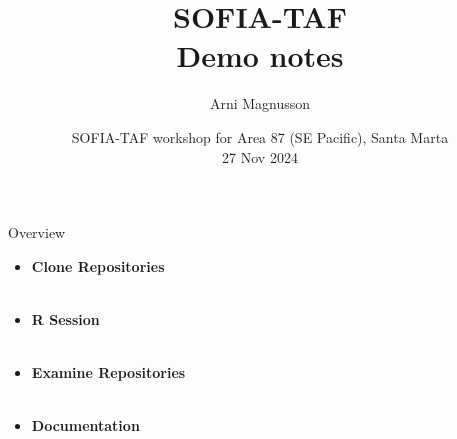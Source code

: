 \documentclass[aspectratio=169]{beamer}
\begin{document}
\begin{frame}
  \title{SOFIA-TAF\\[1ex]
    {\large\darkgreen Demo notes}}
  \author{\vspace{-4ex}
    Arni Magnusson}
  \date{SOFIA-TAF workshop for Area 87 (SE Pacific), Santa Marta\\[0.2ex]
    27 Nov 2024}
  \titlepage
\end{frame}


\begin{frame}{Overview}
  \begin{itemize}
    \item[] {\bf\darkblue Clone Repositories}\\[0.1ex]
    \\[3ex]
    \item[] {\bf\darkblue R Session}\\[0.1ex]
    \\[3ex]
    \item[] {\bf\darkblue Examine Repositories}\\[0.1ex]
    \\[3ex]
    \item[] {\bf\darkblue Documentation}\\[0.1ex]
  \end{itemize}
\end{frame}

\end{document}
